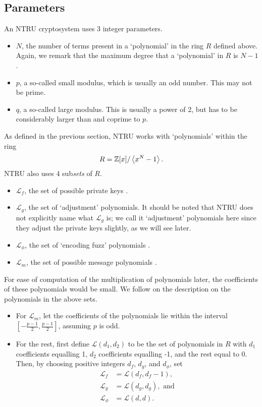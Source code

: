 \subsection{Parameters}
An NTRU cryptosystem uses 3 integer parameters.
\begin{itemize}
    \item $N$, the number of terms present in a `polynomial' in the ring $R$ defined above. Again, we remark that the maximum degree that a `polynomial' in $R$ is $N - 1$.
    \item $p$, a so-called small modulus, which is usually an odd number. This may not be prime.
    \item $q$, a so-called large modulus. This is usually a power of 2, but has to be considerably larger than and coprime to $p$.
\end{itemize}

As defined in the previous section, NTRU works with `polynomials' within the ring
\[
    R = \mathbb{Z}[x] / \left\langle x^N - 1\right\rangle.
\]
NTRU also uses 4 sub\textit{sets} of $R$.
\begin{itemize}
    \item $\mathcal{L}_f$, the set of possible private keys \cite[\S 1.2]{hoffstein_pipher_silverman_1998}.
    \item $\mathcal{L}_g$, the set of `adjustment' polynomials. It should be noted that NTRU does not explicitly name what $\mathcal{L}_g$ is; we call it `adjustment' polynomials here since they adjust the private keys slightly, as we will see later.
    \item $\mathcal{L}_\phi$, the set of `encoding fuzz' polynomials \cite[\S 1.3]{hoffstein_pipher_silverman_1996}.
    \item $\mathcal{L}_m$, the set of possible message polynomials \cite[\S 1.3]{hoffstein_pipher_silverman_1998}.
\end{itemize}

For ease of computation of the multiplication of polynomials later, the coefficients of these polynomials would be small. We follow \cite[\S~2.2]{hoffstein_pipher_silverman_1998} on the description on the polynomials in the above sets.
\begin{itemize}
    \item For $\mathcal{L}_m$, let the coefficients of the polynomials lie within the interval $\left[-\frac{p-1}2, \frac{p-1}2\right]$, assuming $p$ is odd.
    \item For the rest, first define $\mathcal{L}(d_1, d_2)$ to be the set of polynomials in $R$ with $d_1$ coefficients equalling 1, $d_2$ coefficients equalling -1, and the rest equal to 0. Then, by choosing positive integers $d_f$, $d_g$, and $d_\phi$, set
    \begin{align*}
        \mathcal{L}_f &= \mathcal{L}(d_f, d_f-1),\\
        \mathcal{L}_g &= \mathcal{L}(d_g, d_g), \text{ and}\\
        \mathcal{L}_\phi &= \mathcal{L}(d, d).
    \end{align*}
\end{itemize}


